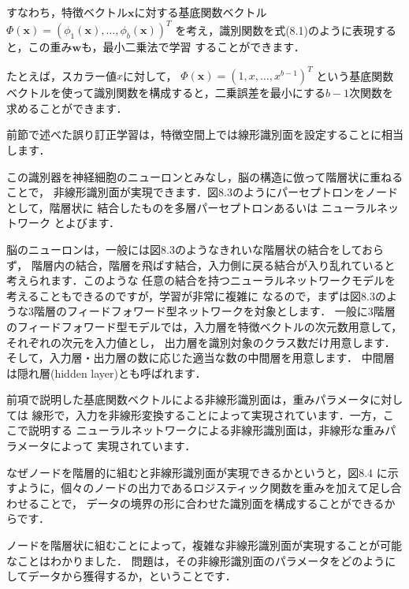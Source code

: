 すなわち，特徴ベクトル$\bm{x}$に対する基底関数ベクトル
$\Phi(\bm{x})=(\phi_1(\bm{x}),\dots,\phi_b(\bm{x}))^T$
を考え，識別関数を式(8.1)のように表現すると，この重み$\bm{w}$も，最小二乗法で学習
することができます．


たとえば，スカラー値$x$に対して，
$\Phi(\bm{x})=(1, x,\dots ,x^{b-1})^T$
という基底関数ベクトルを使って識別関数を構成すると，二乗誤差を最小にする$b-1$次関数を
求めることができます．


前節で述べた誤り訂正学習は，特徴空間上では線形識別面を設定することに相当します．

この識別器を神経細胞のニューロンとみなし，脳の構造に倣って階層状に重ねることで，
非線形識別面が実現できます．図8.3のようにパーセプトロンをノードとして，階層状に
結合したものを多層パーセプトロンあるいは
ニューラルネットワーク
とよびます．


脳のニューロンは，一般には図8.3のようなきれいな階層状の結合をしておらず，
階層内の結合，階層を飛ばす結合，入力側に戻る結合が入り乱れていると考えられます．このような
任意の結合を持つニューラルネットワークモデルを考えることもできるのですが，学習が非常に複雑に
なるので，まずは図8.3のような3階層のフィードフォワード型ネットワークを対象とします．
一般に3階層のフィードフォワード型モデルでは，入力層を特徴ベクトルの次元数用意して，それぞれの次元を入力値とし，
出力層を識別対象のクラス数だけ用意します．そして，入力層・出力層の数に応じた適当な数の中間層を用意します．
中間層は隠れ層(hidden layer)とも呼ばれます．


前項で説明した基底関数ベクトルによる非線形識別面は，重みパラメータに対しては
線形で，入力を非線形変換することによって実現されています．一方，ここで説明する
ニューラルネットワークによる非線形識別面は，非線形な重みパラメータによって
実現されています．

なぜノードを階層的に組むと非線形識別面が実現できるかというと，図8.4
に示すように，個々のノードの出力であるロジスティック関数を重みを加えて足し合わせることで，
データの境界の形に合わせた識別面を構成することができるからです．



ノードを階層状に組むことによって，複雑な非線形識別面が実現することが可能なことはわかりました．
問題は，その非線形識別面のパラメータをどのようにしてデータから獲得するか，ということです．

